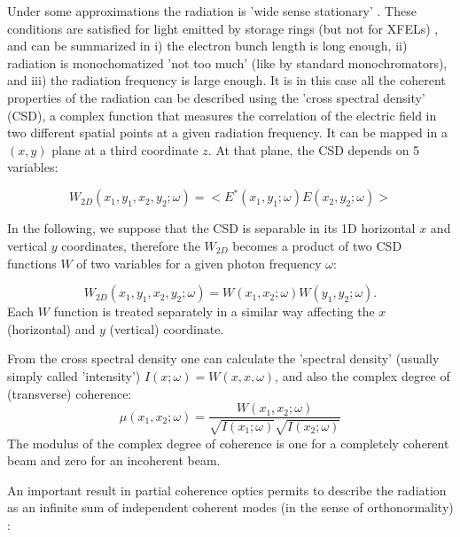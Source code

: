 \documentclass{iucr}              %
\begin{document}
Under some approximations the radiation is 'wide sense stationary' \cite{mandel_wolf}. These conditions are satisfied for light emitted by storage rings (but not for XFELs) \cite{geloni2008}, and can be summarized in
i) the electron bunch length is long enough,
ii) radiation is monochomatized 'not too much' (like by standard monochromators), and 
iii) the radiation frequency is large enough.
It is in this case all the coherent properties of the radiation can be described using the 'cross spectral density' (CSD), a complex function that measures the correlation of the electric field in two different spatial points at a given radiation frequency. It can be mapped in a $(x,y)$ plane at a third coordinate $z$. At that plane, the CSD depends on 5 variables: 

\begin{equation}
W_{2D}(x_1,y_1,x_2,y_2;\omega) = <E^*(x_1,y_1;\omega) E(x_2,y_2;\omega)>
\label{eq:CSD_1D}
\end{equation}

In the following, we suppose that the CSD is separable in its 1D horizontal $x$ and vertical $y$ coordinates, therefore the $W_{2D}$ becomes a product of two CSD functions $W$ of two variables for a given photon frequency $\omega$:

\begin{equation}
W_{2D}(x_1,y_1,x_2,y_2;\omega) = W(x_1,x_2;\omega) W(y_1,y_2;\omega).
\label{eq:CSD_2D}
\end{equation}
Each $W$ function is treated separately in a similar way affecting the $x$ (horizontal) and $y$ (vertical) coordinate.

From the cross spectral density one can calculate the 'spectral density' (usually simply called 'intensity') $I(x;\omega)=W(x,x,\omega)$, and also the complex degree of (transverse) coherence: 
\begin{equation}
\mu(x_1,x_2;\omega) = \frac{W(x_1,x_2;\omega)}{\sqrt{I(x_1;\omega)}\sqrt{I(x_2;\omega)}}
\label{eq:DTC}
\end{equation}
The modulus of the complex degree of coherence is one for a completely coherent beam and zero for an incoherent beam. 

An important result in partial coherence optics permits to describe the radiation as an infinite sum of independent coherent modes (in the sense of orthonormality) :
\end{document}
